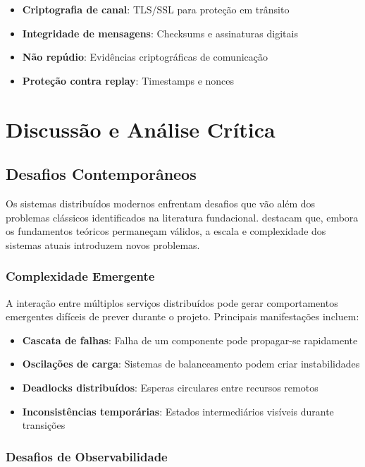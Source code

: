 \begin{itemize}
    \item \textbf{Criptografia de canal}: TLS/SSL para proteção em trânsito
    \item \textbf{Integridade de mensagens}: Checksums e assinaturas digitais
    \item \textbf{Não repúdio}: Evidências criptográficas de comunicação
    \item \textbf{Proteção contra replay}: Timestamps e nonces
\end{itemize}



\section{Discussão e Análise Crítica}

\subsection{Desafios Contemporâneos}

Os sistemas distribuídos modernos enfrentam desafios que vão além dos problemas clássicos identificados na literatura fundacional.  destacam que, embora os fundamentos teóricos permaneçam válidos, a escala e complexidade dos sistemas atuais introduzem novos problemas.

\subsubsection{Complexidade Emergente}

A interação entre múltiplos serviços distribuídos pode gerar comportamentos emergentes difíceis de prever durante o projeto. Principais manifestações incluem:

\begin{itemize}
    \item \textbf{Cascata de falhas}: Falha de um componente pode propagar-se rapidamente
    \item \textbf{Oscilações de carga}: Sistemas de balanceamento podem criar instabilidades
    \item \textbf{Deadlocks distribuídos}: Esperas circulares entre recursos remotos
    \item \textbf{Inconsistências temporárias}: Estados intermediários visíveis durante transições
\end{itemize}

\subsubsection{Desafios de Observabilidade}

